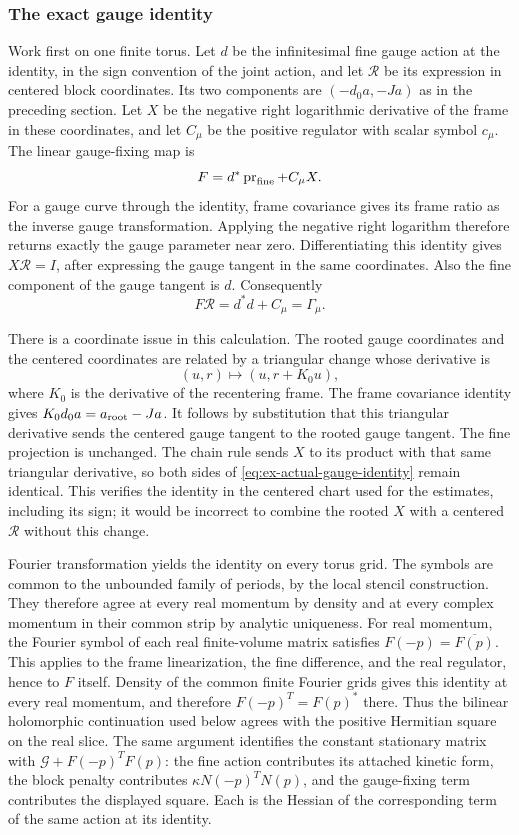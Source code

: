 \subsubsection{The exact gauge identity}
Work first on one finite torus. Let $d$ be the infinitesimal fine gauge
action at the identity, in the sign convention of the joint action,
and let $\mathcal R$ be its expression in centered block coordinates.
Its two components are $(-d_0a,-Ja)$ as in the preceding section.
Let $X$ be the negative right logarithmic derivative of the frame in
these coordinates, and let $C_\mu$ be the positive regulator with scalar
symbol $c_\mu$. The linear gauge-fixing map is
\[
                         F=d^*\operatorname{pr}_{\rm fine}+C_\mu X.
\]
For a gauge curve through the identity, frame covariance gives its frame
ratio as the inverse gauge transformation. Applying the negative right
logarithm therefore returns exactly the gauge parameter near zero.
Differentiating this identity gives $X\mathcal R=I$, after expressing
the gauge tangent in the same coordinates. Also the fine component of
the gauge tangent is $d$. Consequently
\begin{equation}\label{eq:ex-actual-gauge-identity}
                           F\mathcal R=d^*d+C_\mu=\Gamma_\mu.
\end{equation}

There is a coordinate issue in this calculation. The rooted gauge
coordinates and the centered coordinates are related by a triangular
change whose derivative is
\[
                  (u,r)\longmapsto(u,r+K_0u),
\]
where $K_0$ is the derivative of the recentering frame. The frame
covariance identity gives $K_0d_0a=a_{\rm root}-Ja$.
It follows by substitution that this triangular derivative sends the
centered gauge tangent to the rooted gauge tangent. The fine projection
is unchanged. The chain rule sends $X$ to its product with that same
triangular derivative, so both sides of
\eqref{eq:ex-actual-gauge-identity} remain identical. This verifies the
identity in the centered chart used for the estimates, including its
sign; it would be incorrect to combine the rooted $X$ with a centered
$\mathcal R$ without this change.

Fourier transformation yields the identity on every torus grid. The
symbols are common to the unbounded family of periods, by the local
stencil construction. They therefore agree at every real momentum by
density and at every complex momentum in their common strip by analytic
uniqueness. For real momentum, the Fourier symbol of each real finite-volume
matrix satisfies $F(-p)=\overline{F(p)}$. This applies to the frame
linearization, the fine difference, and the real regulator, hence to
$F$ itself. Density of the common finite Fourier grids gives this
identity at every real momentum, and therefore $F(-p)^T=F(p)^*$ there.
Thus the bilinear holomorphic continuation used below agrees with the
positive Hermitian square on the real slice.
The same argument identifies the constant stationary matrix
with $\mathcal G+F(-p)^TF(p)$: the fine action contributes its attached
kinetic form, the block penalty contributes $\kappa N(-p)^TN(p)$, and
the gauge-fixing term contributes the displayed square. Each is the
Hessian of the corresponding term of the same action at its identity.

